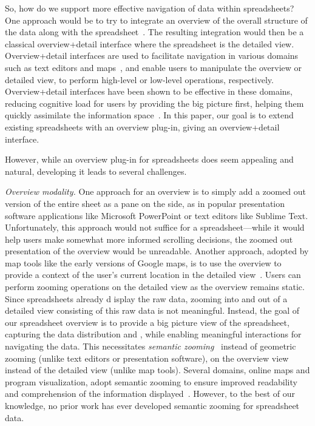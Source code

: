 So, how do we support more effective navigation of data
within spreadsheets?
One approach would be to try to integrate
an overview of the overall structure of the data along
with the spreadsheet~\cite{grudin2001partitioning}.
The resulting integration would then be a classical
overview+detail interface
where the spreadsheet is the detailed view.
Overview+detail interfaces are used
to facilitate navigation in various domains such as 
text editors and maps~\cite{cockburn2009review},
and enable users to manipulate
the overview or detailed view,
to perform high-level or low-level operations,
respectively.
Overview+detail interfaces
have been shown to be effective in these domains,
reducing cognitive load for users by
providing the big picture first,
helping them quickly assimilate the information space~\cite{cockburn2009review}.
In this paper, our goal is to extend
existing spreadsheets
with an overview plug-in, giving an overview+detail interface.

However, while an overview plug-in for spreadsheets
does seem appealing and natural,
developing it leads to several challenges.
\squishlist
\item {\em Overview modality.}
One approach for an overview is to simply add a
zoomed out version of the entire sheet as a pane on the side,
as in popular presentation software applications like Microsoft PowerPoint or text editors
like Sublime Text. 
Unfortunately, this approach
would not suffice for a spreadsheet---while it would help users make
somewhat more informed
scrolling decisions, the zoomed out presentation of the overview would be unreadable.
Another approach, adopted by map tools like the
early versions of Google maps,
is to use the overview
to provide a  context of the user's current location
 in the  detailed view~\cite{cockburn2009review}.
Users can perform zooming operations on the detailed
view as the overview remains static.
Since spreadsheets already d  isplay the raw data,
zooming into and out of a detailed view consisting of
this raw data is not meaningful.
Instead, the goal of our spreadsheet
overview is to provide a big picture view of the spreadsheet,
capturing the
data distribution and ,
while enabling meaningful interactions
for navigating the data.
This necessitates
{\em semantic zooming}~\cite{perlin1993pad} instead of geometric
zooming (unlike text editors or presentation software),
on the overview view instead of the detailed view
(unlike map tools).
Several domains, \eg online maps and program visualization,
adopt semantic zooming
to ensure improved readability and
comprehension of the information displayed~\cite{summers2003experimental}.
However, to the best of our knowledge, no prior work
has ever developed semantic zooming for spreadsheet data.

